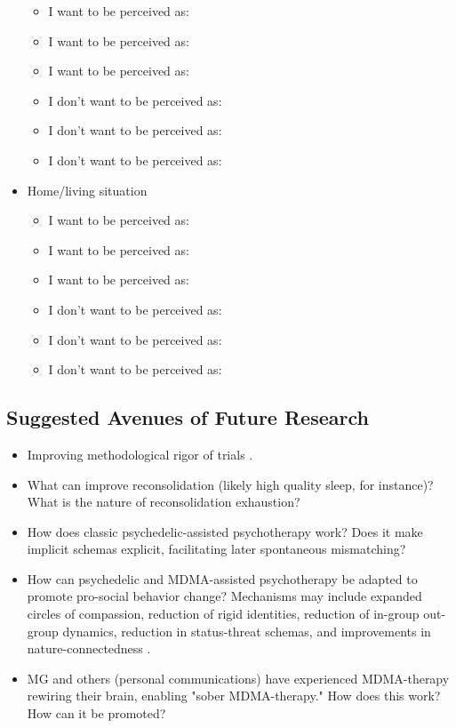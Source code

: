 \documentclass[12pt,letterpaper]{article}
\begin{document}
\begin{itemize}
\begin{itemize}
        \item I want to be perceived as:
        \item I want to be perceived as:
        \item I want to be perceived as:
        \item I don't want to be perceived as:
        \item I don't want to be perceived as:
        \item I don't want to be perceived as:
    \end{itemize}
    \item Home/living situation
    \begin{itemize}
        \item I want to be perceived as:
        \item I want to be perceived as:
        \item I want to be perceived as:
        \item I don't want to be perceived as:
        \item I don't want to be perceived as:
        \item I don't want to be perceived as:
    \end{itemize}
\end{itemize}
\subsection{Suggested Avenues of Future Research}
\begin{itemize}
    \item Improving methodological rigor of trials \cite{adayMethodologicalRigor}.
    \item What can improve reconsolidation (likely high quality sleep, for instance)? What is the nature of reconsolidation exhaustion?
    \item How does classic psychedelic-assisted psychotherapy work? Does it make implicit schemas explicit, facilitating later spontaneous mismatching?
    \item How can psychedelic and MDMA-assisted psychotherapy be adapted to promote pro-social behavior change? Mechanisms may include expanded circles of compassion, reduction of rigid identities, reduction of in-group out-group dynamics, reduction in status-threat schemas, and improvements in nature-connectedness \cite{forstmannPsilocybinNature}.
    \item MG and others (personal communications) have experienced MDMA-therapy rewiring their brain, enabling "sober MDMA-therapy." How does this work? How can it be promoted?
\end{itemize}
\end{document}
